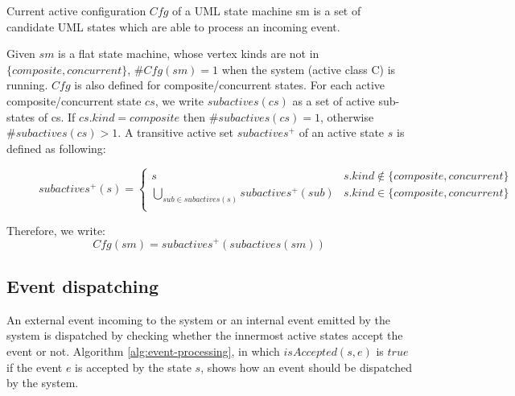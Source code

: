 \begin{definition} Current active configuration $Cfg$ of a UML state machine sm is a set of candidate UML states which are able to process an incoming event. 
\end{definition}

Given $sm$ is a flat state machine, whose vertex kinds are not in $\{composite, concurrent\}$, $\#Cfg (sm) = 1$ when the system (active class C) is running. 
$Cfg$ is also defined for composite/concurrent states. For each active composite/concurrent state $cs$, we write $subactives(cs)$ as a set of active sub-states of cs. If $cs.kind = composite$ then $\#subactives(cs) = 1$, otherwise $\#subactives(cs) > 1$. A transitive active set  $subactives^+$ of an active state $s$ is defined as following:

\begin{figure}
	\normalsize
	\setcounter{mytempeqncnt}{\value{equation}}
	
	\begin{equation}
	subactives^+ (s) =    \left\{
	\begin{array}{ll}
	s & s.kind \notin \{composite, concurrent\}  \\
	\bigcup\limits_{sub \in subactives(s)} subactives^{+} (sub) & s.kind \in \{composite, concurrent\} \\
	\end{array} 
	\right. 
	\end{equation}
	\setcounter{equation}{\value{mytempeqncnt}}
\end{figure}

	


Therefore, we write:
\begin{equation}
	Cfg(sm) = subactives^+(subactives(sm))
\end{equation}

\subsection{Event dispatching}
An external event incoming to the system or an internal event emitted by the system is dispatched by checking whether the innermost active states accept the event or not. Algorithm \ref{alg:event-processing}, in which $isAccepted(s, e)$ is $true$ if the event $e$ is accepted by the state $s$, shows how an event should be dispatched by the system.  

